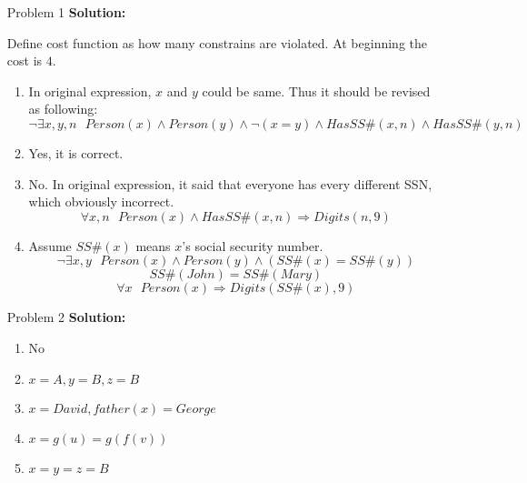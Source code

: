 \normalfont\documentclass[letterpaper,11pt]{article}
\begin{document}
\setlength{\parindent}{2ex}
\newcommand{\header}{
	\noindent {}
}
\bigskip
\header

\begin{enumerate}
\item[Problem 1]\textbf{Solution:}\par
	Define cost function as how many constrains are violated. At beginning the cost is $4$.
	\begin{enumerate}
		\item \par
			In original expression, $x$ and $y$ could be same. Thus it should be revised as following:
			$$\neg \exists x,y,n\text{ }Person(x) \land Person(y) \land \neg(x = y) \land HasSS\#(x,n) \land HasSS\#(y,n)$$ 
		\item \par
			Yes, it is correct.
		\item \par
			No. In original expression, it said that everyone has every different SSN, which obviously incorrect.
			$$\forall x,n\text{ }Person(x) \land HasSS\#(x,n) \Rightarrow Digits(n,9)$$
		\item \par
		Assume $SS\#(x)$ means $x$'s social security number.
		$$\neg \exists x,y\text{ }Person(x) \land Person(y) \land (SS\#(x) = SS\#(y))$$
		$$SS\#(John) = SS\#(Mary)$$
		$$\forall x\text{ }Person(x) \Rightarrow Digits(SS\#(x),9)$$
	\end{enumerate}
\item[Problem 2]\textbf{Solution:}\par
	\begin{enumerate}
		\item No
		\item $x = A, y = B , z = B$
		\item $x = David, father(x) = George$
		\item $x = g(u) = g(f(v))$
		\item $x = y = z = B$

\end{enumerate}
\end{enumerate}
\end{document}
